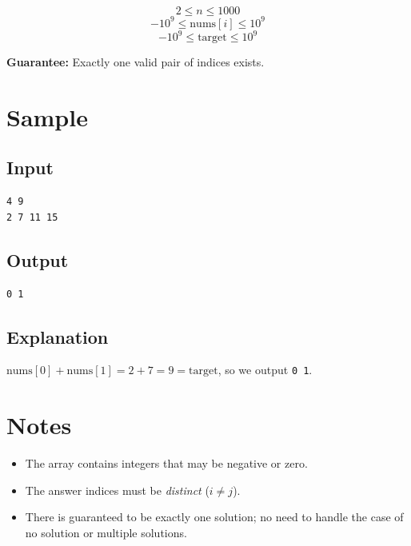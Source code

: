 \documentclass[a4paper,11pt]{article}
\begin{document}
\[
    2 \le n \le 1000
\]
\[
    -10^9 \le \text{nums}[i] \le 10^9
\]
\[
    -10^9 \le \text{target} \le 10^9
\]

\textbf{Guarantee:} Exactly one valid pair of indices exists.

\section*{Sample}

\subsection*{Input}
\begin{lstlisting}
4 9
2 7 11 15
\end{lstlisting}

\subsection*{Output}
\begin{lstlisting}
0 1
\end{lstlisting}

\subsection*{Explanation}
$\text{nums}[0] + \text{nums}[1] = 2 + 7 = 9 = \text{target}$, so we output
\texttt{0 1}.

\section*{Notes}

\begin{itemize}
    \item The array contains integers that may be negative or zero.
    \item The answer indices must be \emph{distinct} ($i \neq j$).
    \item There is guaranteed to be exactly one solution; no need to handle the
          case of no solution or multiple solutions.
\end{itemize}
\end{document}
